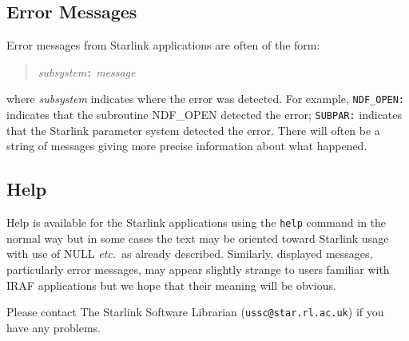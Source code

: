 \documentclass[twoside,11pt]{article}
\newcommand{\htmlref}[2]{#1}
\newcommand{\xlabel}[1]{}
\begin{document}
\subsection{\xlabel{error_messages}\label{error_messages}Error Messages}
Error messages from Starlink applications are often of the form:
\begin{quote}
\textit{subsystem}\texttt{:} \textit{message}
\end{quote}
where \textit{subsystem}
indicates where the error was detected. For example, \texttt{NDF\_OPEN:}
indicates that the subroutine NDF\_OPEN detected the error; \texttt{SUBPAR:}
indicates that the Starlink parameter system detected the error. There will
often be a string of messages giving more precise information about what 
happened.

\subsection{\xlabel{help}Help}
Help is available for the Starlink applications using the \texttt{help} command
in the normal way but in some cases the text may be oriented toward Starlink 
usage with use of NULL \textit{etc.}\ as
\htmlref{already described}{indef_and_null}. 
Similarly, displayed messages, particularly error messages, may appear slightly 
strange to users familiar with IRAF applications but we hope that their meaning 
will be obvious. 

Please contact The Starlink Software Librarian (\texttt{ussc@star.rl.ac.uk}) if 
you have any problems.
\end{document}
